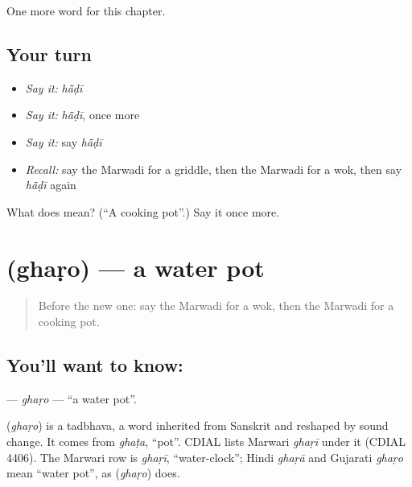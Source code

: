 \begin{grammarlens}[title={What you've built}]
One more word for this chapter.
\end{grammarlens}

\subsection*{Your turn}
\begin{itemize}
\raggedright
  \item \emph{Say it:} \emph{hā̃ḍī}
  \item \emph{Say it:} \emph{hā̃ḍī}, once more
  \item \emph{Say it:} say \emph{hā̃ḍī}
  \item \emph{Recall:} say the Marwadi for a griddle, then the Marwadi for a wok, then say \emph{hā̃ḍī} again
\end{itemize}

\begin{tcolorbox}[breakable,colback=teal!4,colframe=teal!35!black,title={Before you move on}]
What does  mean? (\textquotedblleft{}A cooking pot\textquotedblright{}.) Say it once more.
\end{tcolorbox}
\section[\texorpdfstring{\mw{घड़ो} (ghaṛo)}{घड़ो (ghaṛo)}]{ (ghaṛo) — a water pot}

\label{lesson:MW-C118-gharo}



\begin{quote}
Before the new one: say the Marwadi for a wok, then the Marwadi for a cooking pot.
\end{quote}

\subsection*{You'll want to know: }
\textbf{} — \emph{ghaṛo} — \textquotedblleft{}a water pot\textquotedblright{}.

\begin{cousinweb}
\textbf{} (\emph{ghaṛo}) is a tadbhava, a word inherited from Sanskrit and reshaped by sound change. It comes from \emph{ghaṭa}, \textquotedblleft{}pot\textquotedblright{}. CDIAL lists Marwari \emph{ghaṛī} under it (CDIAL 4406). The Marwari row is \emph{ghaṛī}, \textquotedblleft{}water-clock\textquotedblright{}; Hindi \emph{ghaṛā} and Gujarati \emph{ghaṛo} mean \textquotedblleft{}water pot\textquotedblright{}, as \textbf{} (\emph{ghaṛo}) does.
\end{cousinweb}


